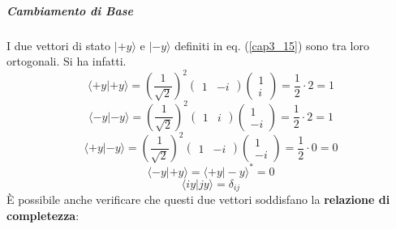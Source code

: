 \documentclass[a4paper,12pt,oneside]{book}
\begin{document}
\subparagraph{Cambiamento di Base}
I due vettori di stato $| +y \rangle $ e $| -y \rangle$ definiti in eq. (\ref{cap3_15}) sono tra loro ortogonali. Si ha infatti.
	\begin{equation}
		\langle +y | +y \rangle=\left(\frac{1}{\sqrt{2}}\right)^2
		\begin{pmatrix}
		1 & -i
		\end{pmatrix}
		\begin{pmatrix}
		1 \\
		i
		\end{pmatrix}=
		\frac{1}{2}\cdot 2= 1
	\end{equation}
	\begin{equation}
		\langle -y | -y \rangle =\left(\frac{1}{\sqrt{2}}\right)^2
		\begin{pmatrix}
		1 & i
		\end{pmatrix}
		\begin{pmatrix}
1 \\
-i
\end{pmatrix}=
		\frac{1}{2}\cdot 2= 1
	\end{equation}
		\begin{equation}
		\langle +y | -y \rangle =\left(\frac{1}{\sqrt{2}}\right)^2
		\begin{pmatrix}
		1 & -i
		\end{pmatrix}
		\begin{pmatrix}
		1 \\
		-i
		\end{pmatrix}=
		\frac{1}{2}\cdot 0= 0
	\end{equation}
	\begin{equation}
		\langle -y | +y \rangle = \langle +y | -y \rangle ^*=0
	\end{equation}
	\begin{equation}
		\langle iy | jy \rangle = \delta_{ij}
	\end{equation}
È possibile anche verificare che questi due vettori soddisfano la \textbf{relazione di completezza}:
\end{document}
